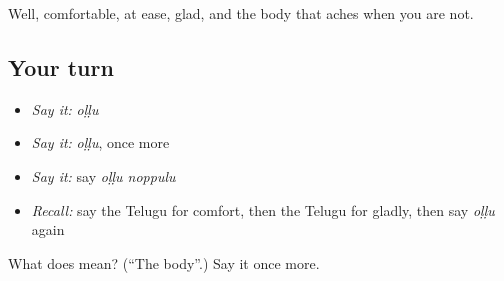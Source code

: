 \begin{grammarlens}[title={What you've built}]
Well, comfortable, at ease, glad, and the body that aches when you are not.
\end{grammarlens}

\subsection*{Your turn}
\begin{itemize}
\raggedright
  \item \emph{Say it:} \emph{oḷḷu}
  \item \emph{Say it:} \emph{oḷḷu}, once more
  \item \emph{Say it:} say \emph{oḷḷu noppulu}
  \item \emph{Recall:} say the Telugu for comfort, then the Telugu for gladly, then say \emph{oḷḷu} again
\end{itemize}

\begin{tcolorbox}[breakable,colback=teal!4,colframe=teal!35!black,title={Before you move on}]
What does  mean? (\textquotedblleft{}The body\textquotedblright{}.) Say it once more.
\end{tcolorbox}
